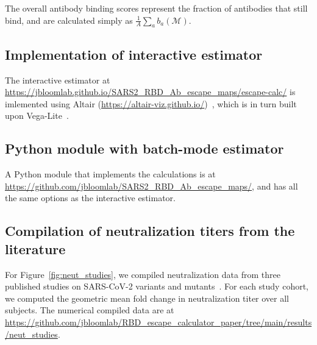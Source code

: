 \documentclass[9pt,twocolumn,twoside]{gsajnl_modified}
\begin{document}
{The overall antibody binding scores represent the fraction of antibodies that still bind, and are calculated simply as $\frac{1}{A}\sum_a b_a\left(\mathcal{M}\right)$.

\subsection{Implementation of interactive estimator}
The interactive estimator at \url{https://jbloomlab.github.io/SARS2_RBD_Ab_escape_maps/escape-calc/} is imlemented using Altair (\url{https://altair-viz.github.io/})~\citep{VanderPlas2018}, which is in turn built upon Vega-Lite~\citep{Satyanarayan2017}.

\subsection{Python module with batch-mode estimator}
A Python module that implements the calculations is at \url{https://github.com/jbloomlab/SARS2_RBD_Ab_escape_maps/}, and has all the same options as the interactive estimator.

\subsection{Compilation of neutralization titers from the literature}
For Figure~\ref{fig:neut_studies}, we compiled neutralization data from three published studies on SARS-CoV-2 variants and mutants~\citep{lucas2021impact,uriu2021neutralization,wang2021antibody}.
For each study cohort, we computed the geometric mean fold change in neutralization titer over all subjects.
The numerical compiled data are at \url{https://github.com/jbloomlab/RBD_escape_calculator_paper/tree/main/results/neut_studies}.

}
\end{document}
